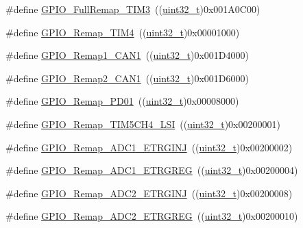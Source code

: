 \begin{DoxyCompactItemize}
\item 
\#define \hyperlink{group___g_p_i_o___remap__define_ga8ba8cef32c5076db1872e173f873dae6}{G\+P\+I\+O\+\_\+\+Full\+Remap\+\_\+\+T\+I\+M3}~((\hyperlink{_p_e___types_8h_a33594304e786b158f3fb30289278f5af}{uint32\+\_\+t})0x001\+A0\+C00)
\item 
\#define \hyperlink{group___g_p_i_o___remap__define_ga041b2f02b32895ce34bcd7499c9e873f}{G\+P\+I\+O\+\_\+\+Remap\+\_\+\+T\+I\+M4}~((\hyperlink{_p_e___types_8h_a33594304e786b158f3fb30289278f5af}{uint32\+\_\+t})0x00001000)
\item 
\#define \hyperlink{group___g_p_i_o___remap__define_ga89ac81224968d8faf42475be664c1e09}{G\+P\+I\+O\+\_\+\+Remap1\+\_\+\+C\+A\+N1}~((\hyperlink{_p_e___types_8h_a33594304e786b158f3fb30289278f5af}{uint32\+\_\+t})0x001\+D4000)
\item 
\#define \hyperlink{group___g_p_i_o___remap__define_gad4f5b46cf24bed1563b22e6ecca3ebef}{G\+P\+I\+O\+\_\+\+Remap2\+\_\+\+C\+A\+N1}~((\hyperlink{_p_e___types_8h_a33594304e786b158f3fb30289278f5af}{uint32\+\_\+t})0x001\+D6000)
\item 
\#define \hyperlink{group___g_p_i_o___remap__define_gaeac44191de99d55a5fa03e29b74d5e59}{G\+P\+I\+O\+\_\+\+Remap\+\_\+\+P\+D01}~((\hyperlink{_p_e___types_8h_a33594304e786b158f3fb30289278f5af}{uint32\+\_\+t})0x00008000)
\item 
\#define \hyperlink{group___g_p_i_o___remap__define_gad909488d0b7a0cfa1116a66e962e3c62}{G\+P\+I\+O\+\_\+\+Remap\+\_\+\+T\+I\+M5\+C\+H4\+\_\+\+L\+SI}~((\hyperlink{_p_e___types_8h_a33594304e786b158f3fb30289278f5af}{uint32\+\_\+t})0x00200001)
\item 
\#define \hyperlink{group___g_p_i_o___remap__define_gaf79d966f49b64d3feb0ba9cc39294dac}{G\+P\+I\+O\+\_\+\+Remap\+\_\+\+A\+D\+C1\+\_\+\+E\+T\+R\+G\+I\+NJ}~((\hyperlink{_p_e___types_8h_a33594304e786b158f3fb30289278f5af}{uint32\+\_\+t})0x00200002)
\item 
\#define \hyperlink{group___g_p_i_o___remap__define_gab1d040cab5d9f16f362edc2e8b47a82a}{G\+P\+I\+O\+\_\+\+Remap\+\_\+\+A\+D\+C1\+\_\+\+E\+T\+R\+G\+R\+EG}~((\hyperlink{_p_e___types_8h_a33594304e786b158f3fb30289278f5af}{uint32\+\_\+t})0x00200004)
\item 
\#define \hyperlink{group___g_p_i_o___remap__define_gae00aaabeed54e805932ec6978acf000d}{G\+P\+I\+O\+\_\+\+Remap\+\_\+\+A\+D\+C2\+\_\+\+E\+T\+R\+G\+I\+NJ}~((\hyperlink{_p_e___types_8h_a33594304e786b158f3fb30289278f5af}{uint32\+\_\+t})0x00200008)
\item 
\#define \hyperlink{group___g_p_i_o___remap__define_gaa782a0c482f34507c82e4cd639bb747e}{G\+P\+I\+O\+\_\+\+Remap\+\_\+\+A\+D\+C2\+\_\+\+E\+T\+R\+G\+R\+EG}~((\hyperlink{_p_e___types_8h_a33594304e786b158f3fb30289278f5af}{uint32\+\_\+t})0x00200010)

\end{DoxyCompactItemize}
